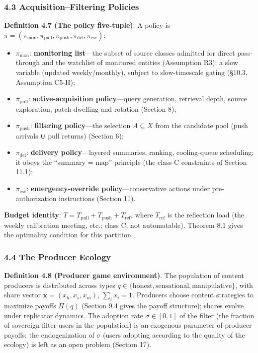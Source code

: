 \documentclass[
  11pt]{article}
\providecommand{\tightlist}{%
  \setlength{\itemsep}{0pt}\setlength{\parskip}{0pt}}
\begin{document}
\subsubsection{4.3 Acquisition--Filtering
Policies}\label{acquisitionfiltering-policies}

\textbf{Definition 4.7 (The policy five-tuple)}. A policy is
\(\pi = (\pi_{\mathrm{mon}}, \pi_{\mathrm{pull}}, \pi_{\mathrm{push}}, \pi_{\mathrm{del}}, \pi_{\mathrm{esc}})\):

\begin{itemize}
\tightlist
\item
  \(\pi_{\mathrm{mon}}\): \textbf{monitoring list}---the subset of
  source classes admitted for direct pass-through and the watchlist of
  monitored entities (Assumption R3); a slow variable (updated
  weekly/monthly), subject to slow-timescale gating (§10.3, Assumption
  C5-H);
\item
  \(\pi_{\mathrm{pull}}\): \textbf{active-acquisition policy}---query
  generation, retrieval depth, source exploration, patch dwelling and
  rotation (Section 8);
\item
  \(\pi_{\mathrm{push}}\): \textbf{filtering policy}---the selection
  \(A \subseteq X\) from the candidate pool (push arrivals ∪ pull
  returns) (Section 6);
\item
  \(\pi_{\mathrm{del}}\): \textbf{delivery policy}---layered summaries,
  ranking, cooling-queue scheduling; it obeys the ``summary = map''
  principle (the class-C constraints of Section 11.1);
\item
  \(\pi_{\mathrm{esc}}\): \textbf{emergency-override
  policy}---conservative actions under pre-authorization instructions
  (Section 11).
\end{itemize}

\textbf{Budget identity}:
\(T = T_{\mathrm{pull}} + T_{\mathrm{push}} + T_{\mathrm{ref}}\), where
\(T_{\mathrm{ref}}\) is the reflection load (the weekly calibration
meeting, etc.; class C, not automatable). Theorem 8.1 gives the
optimality condition for this partition.

\subsubsection{4.4 The Producer Ecology}\label{the-producer-ecology}

\textbf{Definition 4.8 (Producer game environment)}. The population of
content producers is distributed across types
\(q \in \{\mathrm{honest}, \mathrm{sensational}, \mathrm{manipulative}\}\),
with share vector \(\mathbf{x} = (x_h, x_s, x_m)\), \(\sum_i x_i = 1\).
Producers choose content strategies to maximize payoffs \(\Pi(q)\)
(Section 9.4 gives the payoff structure); shares evolve under replicator
dynamics. The adoption rate \(\sigma \in [0,1]\) of the filter (the
fraction of sovereign-filter users in the population) is an exogenous
parameter of producer payoffs; the endogenization of \(\sigma\) (users
adopting according to the quality of the ecology) is left as an open
problem (Section 17).
\end{document}
